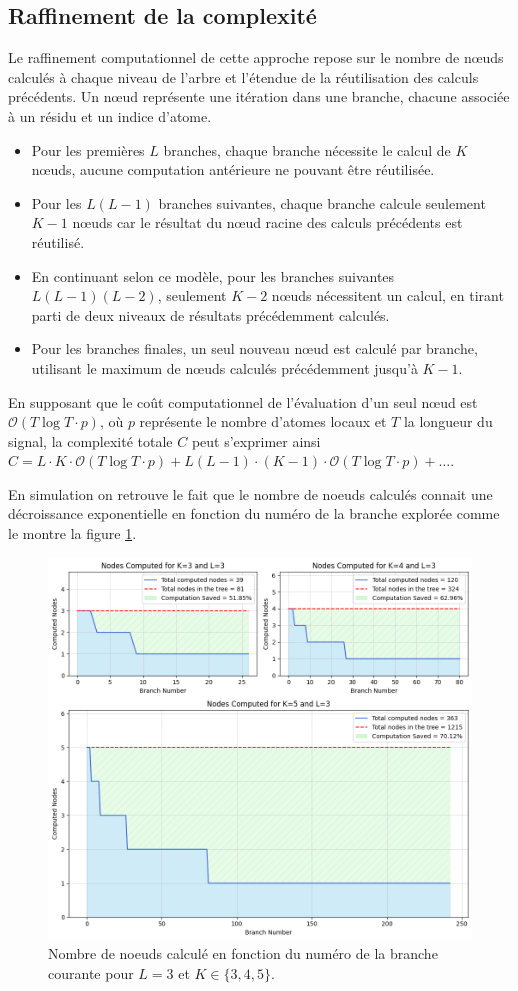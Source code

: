\documentclass[9pt,a4paper,twoside]{rho}
\begin{document}
\subsection{Raffinement de la complexité}
Le raffinement computationnel de cette approche repose sur le nombre de nœuds calculés à chaque niveau de l'arbre et l'étendue de la réutilisation des calculs précédents. Un nœud représente une itération dans une branche, chacune associée à un résidu et un indice d'atome.

\begin{itemize}
    \item Pour les premières \(L\) branches, chaque branche nécessite le calcul de \(K\) nœuds, aucune computation antérieure ne pouvant être réutilisée.
    
    \item Pour les \(L(L-1)\) branches suivantes, chaque branche calcule seulement \(K-1\) nœuds car le résultat du nœud racine des calculs précédents est réutilisé.
    \item En continuant selon ce modèle, pour les branches suivantes \(L(L-1)(L-2)\), seulement \(K-2\) nœuds nécessitent un calcul, en tirant parti de deux niveaux de résultats précédemment calculés.
    \item Pour les branches finales, un seul nouveau nœud est calculé par branche, utilisant le maximum de nœuds calculés précédemment jusqu'à \(K-1\).
\end{itemize}
En supposant que le coût computationnel de l'évaluation d'un seul nœud est $\mathcal{O}( T \log T \cdot p)$, où $p$ représente le nombre d'atomes locaux et $T$ la longueur du signal, la complexité totale $C$ peut s'exprimer ainsi $ C = L \cdot K \cdot \mathcal{O}(T \log T \cdot p) + L(L-1) \cdot (K-1) \cdot \mathcal{O}(T \log T \cdot p) + \ldots $.

En simulation on retrouve le fait que le nombre de noeuds calculés connait une décroissance exponentielle en fonction du numéro de la branche explorée comme le montre la figure \ref{fig:computation_deconv}.
\begin{figure}[H]
    \centering
    \includegraphics[width=0.8\linewidth]{images/mmpdf_computation.png}
    \caption{Nombre de noeuds calculé en fonction du numéro de la branche courante pour $L=3$ et $K \in \{3, 4, 5 \}$.}
    \label{fig:computation_deconv}
\end{figure}
\end{document}
